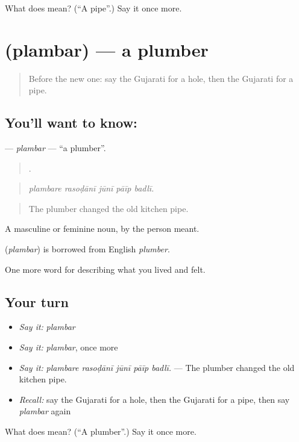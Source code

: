 \begin{tcolorbox}[breakable,colback=teal!4,colframe=teal!35!black,title={Before you move on}]
What does  mean? (\textquotedblleft{}A pipe\textquotedblright{}.) Say it once more.
\end{tcolorbox}
\section[\texorpdfstring{\gu{પ્લમ્બર} (plambar)}{પ્લમ્બર (plambar)}]{ (plambar) — a plumber}

\label{lesson:GU-C515-plambar}



\begin{quote}
Before the new one: say the Gujarati for a hole, then the Gujarati for a pipe.
\end{quote}

\subsection*{You'll want to know: }
\textbf{} — \emph{plambar} — \textquotedblleft{}a plumber\textquotedblright{}.

\begin{quote}
    .
\end{quote}

\begin{quote}
\emph{plambare rasoḍānī jūnī pāīp badlī.}
\end{quote}

\begin{quote}
The plumber changed the old kitchen pipe.
\end{quote}

A masculine or feminine noun, by the person meant.

\begin{cousinweb}
\textbf{} (\emph{plambar}) is borrowed from English \emph{plumber}.
\end{cousinweb}

\begin{grammarlens}[title={What you've built}]
One more word for describing what you lived and felt.
\end{grammarlens}

\subsection*{Your turn}
\begin{itemize}
\raggedright
  \item \emph{Say it:} \emph{plambar}
  \item \emph{Say it:} \emph{plambar}, once more
  \item \emph{Say it:} \emph{plambare rasoḍānī jūnī pāīp badlī.} — The plumber changed the old kitchen pipe.
  \item \emph{Recall:} say the Gujarati for a hole, then the Gujarati for a pipe, then say \emph{plambar} again
\end{itemize}

\begin{tcolorbox}[breakable,colback=teal!4,colframe=teal!35!black,title={Before you move on}]
What does  mean? (\textquotedblleft{}A plumber\textquotedblright{}.) Say it once more.
\end{tcolorbox}
